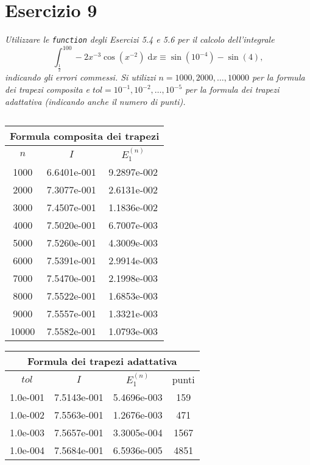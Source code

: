 \section{Esercizio 9}
\label{sub:es9}
\emph{Utilizzare le \lstinline{function} degli Esercizi 5.4 e 5.6 per il calcolo dell'integrale
      $$\int_{\frac{1}{2}}^{100}-2x^{-3}\cos\left(x^{-2}\right)\;\mathrm{d}x\equiv\sin\left(10^{-4}\right)-\sin(4),$$
			indicando gli errori commessi.
      Si utilizzi $n=1000,2000,\dots,10000$ per la formula dei trapezi composita e
      $tol=10^{-1},10^{-2},\dots,10^{-5}$ per la formula dei trapezi adattativa (indicando anche il numero di punti).}
\begin{sol}
	
	\normalfont
	$ $\\
	\begin{center}\begin{tabular}{c|c|c}
	\hline\multicolumn{3}{c}{Formula composita dei trapezi}\\\hline
	$n$ & $I$ & $E_1^{(n)}$\\\hline
	1000&6.6401e-001&9.2897e-002\\
	2000&7.3077e-001&2.6131e-002\\
	3000&7.4507e-001&1.1836e-002\\
	4000&7.5020e-001&6.7007e-003\\
	5000&7.5260e-001&4.3009e-003\\
	6000&7.5391e-001&2.9914e-003\\
	7000&7.5470e-001&2.1998e-003\\
	8000&7.5522e-001&1.6853e-003\\
	9000&7.5557e-001&1.3321e-003\\
	10000&7.5582e-001&1.0793e-003
	\end{tabular}\end{center}
	\begin{center}
	\begin{tabular}{c|c|c|c}
	\hline\multicolumn{4}{c}{Formula dei trapezi adattativa}\\\hline
	$tol$ & $I$ & $E_1^{(n)}$ & punti\\\hline
		1.0e-001&7.5143e-001&5.4696e-003&159\\
		1.0e-002&7.5563e-001&1.2676e-003&471\\
		1.0e-003&7.5657e-001&3.3005e-004&1567\\
		1.0e-004&7.5684e-001&6.5936e-005&4851
	\end{tabular}\end{center}
\end{sol}

